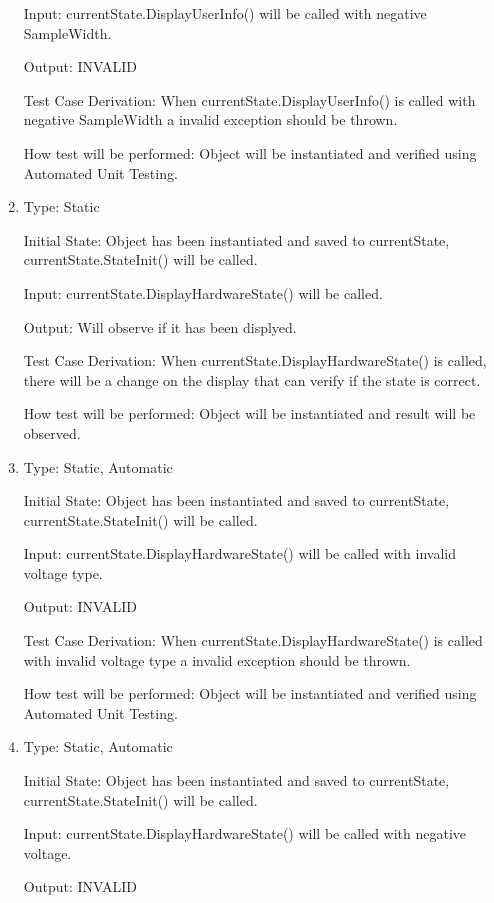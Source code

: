 \documentclass[12pt, titlepage]{article}
\begin{document}
\begin{enumerate}[{UT-CS}1.]
Input: currentState.DisplayUserInfo() will be called with negative SampleWidth.
					
Output: INVALID

Test Case Derivation: When currentState.DisplayUserInfo() is called with negative SampleWidth a invalid exception should be thrown.

How test will be performed: Object will be instantiated and verified using Automated Unit Testing.

\item

Type: Static
          
Initial State: Object has been instantiated and saved to currentState, currentState.StateInit() will be called.
          
Input: currentState.DisplayHardwareState() will be called.
          
Output: Will observe if it has been displyed.

Test Case Derivation: When currentState.DisplayHardwareState() is called, there will be a change on the display that can verify if the state is correct.


How test will be performed: Object will be instantiated and result will be observed.

\item

Type: Static, Automatic
					
Initial State: Object has been instantiated and saved to currentState, currentState.StateInit() will be called.
					
Input: currentState.DisplayHardwareState() will be called with invalid voltage type.
					
Output: INVALID

Test Case Derivation: When currentState.DisplayHardwareState() is called with invalid voltage type a invalid exception should be thrown.

How test will be performed: Object will be instantiated and verified using Automated Unit Testing.

\item

Type: Static, Automatic
					
Initial State: Object has been instantiated and saved to currentState, currentState.StateInit() will be called.
					
Input: currentState.DisplayHardwareState() will be called with negative voltage.
					
Output: INVALID


\end{enumerate}
\end{document}
